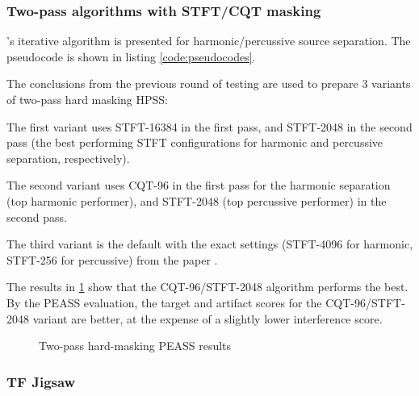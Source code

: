 \documentclass[letter,12pt]{article}
\newenvironment{tight_enumerate}{
\begin{enumerate}
  \setlength{\itemsep}{0pt}
  \setlength{\parskip}{0pt}
}{\end{enumerate}}
\begin{document}
\subsubsection{Two-pass algorithms with STFT/CQT masking}

\citet{driedger}'s iterative algorithm is presented for harmonic/percussive source separation. The pseudocode is shown in listing \ref{code:pseudocodes}.

The conclusions from the previous round of testing are used to prepare 3 variants of two-pass hard masking HPSS:
\begin{tight_enumerate}
	\item
		The first variant uses STFT-16384 in the first pass, and STFT-2048 in the second pass (the best performing STFT configurations for harmonic and percussive separation, respectively).
	\item
		The second variant uses CQT-96 in the first pass for the harmonic separation (top harmonic performer), and STFT-2048 (top percussive performer) in the second pass.
	\item
		The third variant is the default with the exact settings (STFT-4096 for harmonic, STFT-256 for percussive) from the paper \cite{driedger}.
\end{tight_enumerate}

The results in \ref{fig:round2hard} show that the CQT-96/STFT-2048 algorithm performs the best. By the PEASS evaluation, the target and artifact scores for the CQT-96/STFT-2048 variant are better, at the expense of a slightly lower interference score.

\begin{figure}[ht]
	\centering
	\vspace{-1.25em}
	\caption{Two-pass hard-masking PEASS results}
	\label{fig:round2hard}
\end{figure}

\subsubsection{TF Jigsaw}
\end{document}
